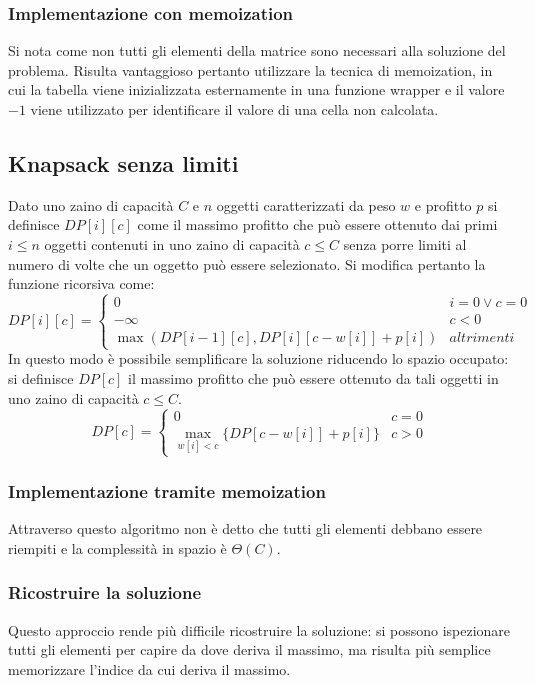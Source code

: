 \subsubsection{Implementazione con memoization}
Si nota come non tutti gli elementi della matrice sono necessari alla soluzione del problema. Risulta vantaggioso pertanto utilizzare la tecnica di 
memoization, in cui la tabella viene inizializzata esternamente in una funzione wrapper e il valore $-1$ viene utilizzato per identificare il valore di
una cella non calcolata. \\

\subsection{Knapsack senza limiti}
Dato uno zaino di capacit\`a $C$ e $n$ oggetti caratterizzati da peso $w$ e profitto $p$ si definisce $DP[i][c]$ come il massimo profitto che pu\`o essere
ottenuto dai primi $i\le n$ oggetti contenuti in uno zaino di capacit\`a $c\le C$ senza porre limiti al numero di volte che un oggetto pu\`o essere 
selezionato. Si modifica pertanto la funzione ricorsiva come:
$$
DP[i][c] =
\begin{cases}
0\quad & i = 0 \lor c = 0\\
-\infty & c<0\\
\max(DP[i-1][c], DP[i][c-w[i]]+p[i]) & altrimenti
\end{cases}
$$
In questo modo \`e possibile semplificare la soluzione riducendo lo spazio occupato: si definisce $DP[c]$ il massimo profitto che pu\`o essere ottenuto
da tali oggetti in uno zaino di capacit\`a $c\le C$. 
$$
DP[c] =
\begin{cases}
0\quad & c = 0\\
\max\limits_{w[i]<c}\{DP[c-w[i]]+p[i]\} &  c > 0
\end{cases}
$$
\subsubsection{Implementazione tramite memoization}

Attraverso questo algoritmo non \`e detto che tutti gli elementi debbano essere riempiti e la complessit\`a in spazio \`e $\Theta(C)$.
\subsubsection{Ricostruire la soluzione}
Questo approccio rende pi\`u difficile ricostruire la soluzione: si possono ispezionare tutti gli elementi per capire da dove deriva il massimo, ma 
risulta pi\`u semplice memorizzare l'indice da cui deriva il massimo. 
